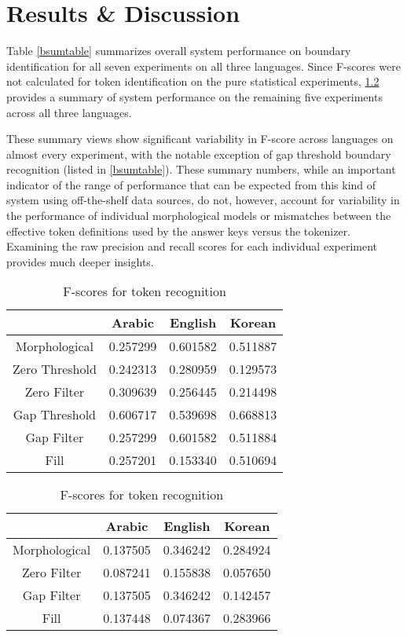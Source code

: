\chapter{Results \& Discussion}
\FloatBarrier

Table \ref{bsumtable} summarizes overall system performance on boundary identification for all seven experiments on all three languages. Since F-scores were not calculated for token identification on the pure statistical experiments, \ref{tsumtable} provides a summary of system performance on the remaining five experiments across all three languages.

These summary views show significant variability in F-score across languages on almost every experiment, with the notable exception of gap threshold boundary recognition (listed in \ref{bsumtable}). These summary numbers, while an important indicator of the range of performance that can be expected from this kind of system using off-the-shelf data sources, do not, however, account for variability in the performance of individual morphological models or mismatches between the effective token definitions used by the answer keys versus the tokenizer. Examining the raw precision and recall scores for each individual experiment provides much deeper insights.

\begin{table}
	\parbox{1\linewidth}{
		\centering
		\begin{tabular}{ | c | c | c | c |}
			\cline{2-4}
			\multicolumn{1}{c|}{} & Arabic & English & Korean \\ \hline
			Morphological & 0.257299 & 0.601582 & 0.511887 \\ \hline \hline
			Zero Threshold & 0.242313 & 0.280959 & 0.129573 \\ \hline
			Zero Filter & 0.309639 & 0.256445 & 0.214498 \\\hline \hline
			Gap Threshold & 0.606717 & 0.539698 & 0.668813 \\ \hline
			Gap Filter & 0.257299 & 0.601582 & 0.511884 \\ \hline \hline
			Fill & 0.257201 & 0.153340 & 0.510694 \\ \hline
		\end{tabular}
		\caption{F-scores for boundary recognition}
		\label{bsumtable}
	}

	\parbox{1\linewidth}{
		\centering
		\begin{tabular}{ | c | c | c | c |}
			\cline{2-4}
			\multicolumn{1}{c|}{} & Arabic & English & Korean \\ \hline
			Morphological & 0.137505 & 0.346242 & 0.284924 \\ \hline
			Zero Filter & 0.087241 & 0.155838 & 0.057650 \\ \hline
			Gap Filter & 0.137505 & 0.346242 & 0.142457 \\ \hline
			Fill & 0.137448 & 0.074367 & 0.283966 \\ \hline
		\end{tabular}
		\caption{F-scores for token recognition}
		\label{tsumtable}
	}
\end{table}
\FloatBarrier

